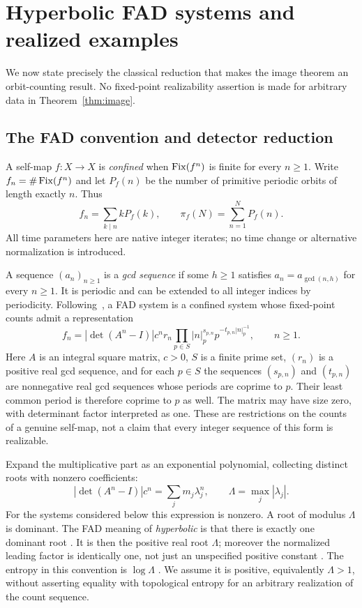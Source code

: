 \section{Hyperbolic FAD systems and realized examples}\label{sec:dynamics}

We now state precisely the classical reduction that makes the image
theorem an orbit-counting result. No fixed-point realizability assertion
is made for arbitrary data in Theorem~\ref{thm:image}.

\subsection{The FAD convention and detector reduction}

A self-map $f:X\to X$ is \emph{confined} when $\operatorname{Fix}(f^n)$ is finite for
every $n\geq1$. Write $f_n=\#\operatorname{Fix}(f^n)$ and let $P_f(n)$ be the number
of primitive periodic orbits of length exactly $n$. Thus
\[
 f_n=\sum_{k\mid n}kP_f(k),\qquad
 \pi_f(N)=\sum_{n=1}^{N}P_f(n).
\]
All time parameters here are native integer iterates; no time change or
alternative normalization is introduced.

A sequence $(a_n)_{n\geq1}$ is a \emph{gcd sequence} if some $h\geq1$
satisfies $a_n=a_{\gcd(n,h)}$ for every $n\geq1$. It is periodic and can
be extended to all integer indices by periodicity.
Following~\cite[Definitions 7.1.1--7.1.2]{bch2024}, a FAD system is a
confined system whose fixed-point counts admit a representation
\begin{equation}\label{eq:fad_counts}
 f_n=|\det(A^n-I)|c^n r_n
       \prod_{p\in S}|n|_p^{s_{p,n}}p^{-t_{p,n}|n|_p^{-1}},
 \qquad n\geq1.
\end{equation}
Here $A$ is an integral square matrix, $c>0$, $S$ is a finite prime set,
$(r_n)$ is a positive real gcd sequence, and for each $p\in S$ the
sequences $(s_{p,n})$ and $(t_{p,n})$ are nonnegative real gcd sequences
whose periods are coprime to $p$. Their least common period is therefore
coprime to $p$ as well. The matrix may have size zero, with determinant
factor interpreted as one. These are restrictions on the counts of a
genuine self-map, not a claim that every integer sequence of this form is
realizable.

Expand the multiplicative part as an exponential polynomial, collecting
distinct roots with nonzero coefficients:
\begin{equation}\label{eq:dominant_roots}
 |\det(A^n-I)|c^n=\sum_j m_j\lambda_j^n,
 \qquad \Lambda=\max_j|\lambda_j|.
\end{equation}
For the systems considered below this expression is nonzero. A root of
modulus $\Lambda$ is dominant. The FAD meaning of \emph{hyperbolic} is
that there is exactly one dominant root
\cite[Definition 10.3.9]{bch2024}. It is then the positive real root
$\Lambda$; moreover the normalized leading factor is identically one,
not just an unspecified positive constant
\cite[Lemmas 10.3.2 and 10.3.10]{bch2024}.
The entropy in this convention is $\log\Lambda$
\cite[Definition 10.3.4]{bch2024}. We assume it is positive, equivalently
$\Lambda>1$, without asserting equality with topological entropy for an
arbitrary realization of the count sequence.

